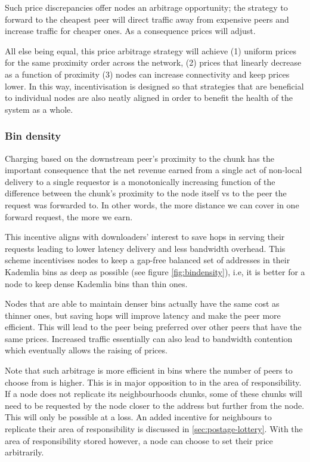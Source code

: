 Such price discrepancies offer nodes an arbitrage opportunity; the strategy to forward to the cheapest peer will direct traffic away from expensive peers and increase traffic for cheaper ones. As a consequence prices will adjust. 

All else being equal, this price arbitrage strategy will achieve (1) uniform prices for the same proximity order across the network, (2) prices that linearly decrease as a function of proximity (3) nodes can increase connectivity and keep prices lower. In this way, incentivisation is designed so that strategies that are beneficial to individual nodes are also neatly aligned in order to benefit the health of the system as a whole.


\subsubsection{Bin density}

Charging based on the downstream peer's proximity to the chunk has the important consequence that the net revenue earned from a single act of non-local delivery to a single requestor is a monotonically increasing function of the difference between the chunk's proximity to the node itself vs to the peer the request was forwarded to. In other words, the more distance we can cover in one forward request, the more we earn. 

This incentive aligns with downloaders' interest to save hops in serving their requests leading to lower latency delivery and less bandwidth overhead. This scheme incentivises nodes to keep a gap-free balanced set of addresses in their Kademlia bins as deep as possible (see figure \ref{fig:bindensity}), i.e, it is better for a node to keep dense Kademlia bins than thin ones.


Nodes that are able to maintain denser bins actually have the same cost as thinner ones, but saving hops will improve latency and make the peer more efficient. This will lead to the peer being preferred over other peers that have the same prices. Increased traffic essentially can also lead to bandwidth contention which eventually allows the raising of prices. 

Note that such arbitrage is more efficient in  bins where the number of peers to choose from is higher. This is in major opposition to  in the area of responsibility. If a node does not replicate its neighbourhoods chunks, some of these chunks will need to be requested by the node closer to the address but further from the node. This will only be possible at a loss. An added incentive for neighbours to replicate their area of responsibility is discussed in \ref{sec:postage-lottery}. With the area of responsibility stored however, a node can choose to set their price arbitrarily. 


